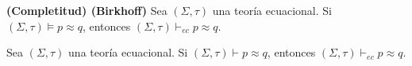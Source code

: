   \begin{theorem} \label{theorem_89}
    \PN \textbf{(Completitud) (Birkhoff)} Sea $(\Sigma, \tau)$ una teoría ecuacional. Si $(\Sigma, \tau) \models p
    \approx q$, entonces $(\Sigma, \tau) \vdash_{ec} p \approx q$.
  \end{theorem}

  \begin{corollary} \label{corollary_90}
    \PN Sea $(\Sigma, \tau)$ una teoría ecuacional. Si $(\Sigma, \tau) \vdash p \approx q$, entonces $(\Sigma, \tau)
    \vdash_{ec} p \approx q$.
  \end{corollary}
